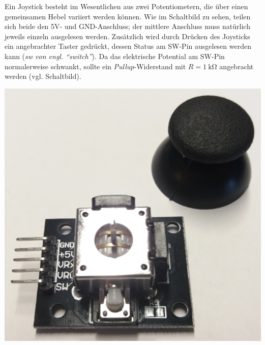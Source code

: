 \medskip
\begin{minipage}{0.73\textwidth}
	Ein Joystick besteht im Wesentlichen aus zwei Potentiometern, die über einen gemeinsamen Hebel variiert werden können. Wie im Schaltbild zu sehen, teilen sich beide den 5V- und GND-Anschluss; der mittlere Anschluss muss natürlich jeweils einzeln ausgelesen werden. Zusätzlich wird durch Drücken des Joysticks ein angebrachter Taster gedrückt, dessen Status am SW-Pin ausgelesen werden kann (\emph{sw von engl. \enquote{switch}}). Da das elektrische Potential am SW-Pin normalerweise schwankt, sollte ein \emph{Pullup}-Widerstand mit $R=\SI{1}{\kilo\ohm}$ angebracht werden (vgl. Schaltbild).	
\end{minipage}
\hfill
\begin{minipage}{0.25\textwidth}
	\centering
	\includegraphics[width=\linewidth]{./pics/joystick.jpg}
\end{minipage}

